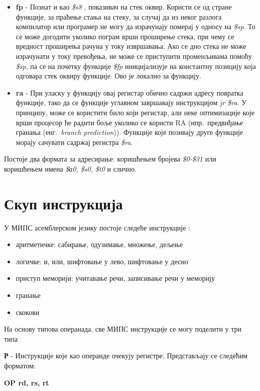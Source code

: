 \documentclass[12pt,oneside]{memoir}
\begin{document}
\begin{itemize}
\item \textbf{fp} - Познат и као \textit{\$s8} , показивач на стек оквир. Користи се од стране функције, за праћење стања на стеку, за случај да из неког разлога компилатор или програмер не могу да израчунају померај у односу на \textit{\$sp}. То се може догодити уколико пограм врши проширење стека, при чему се вредност проширења рачуна у току извршавања. Ако се дно стека не може израчунати у току превођења, не може се приступити променљивама помоћу \textit{\$sp}, па се на почетку функције \textit{\$fp} иницијализује на константну позицију која одговара стек оквиру функције. Ово је локално за функцију.

\item \textbf{ra} - При уласку у функцију овај регистар обично садржи адресу повратка функције, тако да се функције углавном завршавају инструкцијом \textit{jr \$ra}. У принципу, може се користити било који регистар, али неке оптимизације које врши процесор ће радити боље уколико се користи RA (нпр.~предвиђање гранања (енг.~\textit{branch prediction})). Функције које позивају друге функције морају сачувати садржај регистра \textit{\$ra}.
\end{itemize}

Постоје два формата за адресирање: коришћењем бројева \textit{\$0-\$31} или коришћењем имена \textit{\$а0, \$s0, \$t0} и слично.

\section{Скуп инструкција}
\label{instructions}
У МИПС асемблерском језику постоје следеће инструкције \cite{mips1}:
\begin{itemize}
\item аритметичке: сабирање, одузимање, множење, дељење
\item логичке: и, или, шифтовање у лево, шифтовање у десно
\item приступ меморији: учитавање речи, записивање речи у меморију
\item гранање
\item скокови
\end{itemize}
На основу типова операнада, све МИПС инструкције се могу поделити у три типа \cite{mips_viki}

\textbf{Р} - Инструкције које као операнде очекују регистре.
Представљају се следећим форматом:
\begin{listing}
\centering
\textbf{OP rd, rs, rt}
\end{listing}
\end{document}

